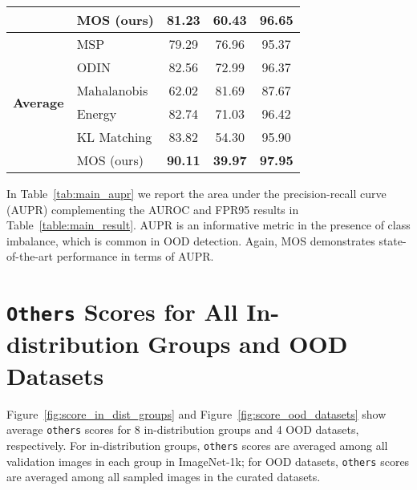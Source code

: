 \documentclass[final]{cvpr}
\begin{document}
\begin{table*}[h]
\begin{tabular}{l|l|ccc}
                                      & MOS (ours)                                            & 81.23                & 60.43                & 96.65                \\ \midrule
\multirow{6}{*}{\textbf{Average}}     & MSP                                                   & 79.29                & 76.96                & 95.37                \\
                                      & ODIN                                                  & 82.56                & 72.99                & 96.37                \\
                                      & Mahalanobis                                           & 62.02                & 81.69                & 87.67                \\
                                      & Energy                                                & 82.74                & 71.03                & 96.42                \\
                                      & KL Matching                                           & 83.82                & 54.30                & 95.90                \\
                                      & MOS (ours)                                            & \textbf{90.11}       & \textbf{39.97}       & \textbf{97.95}       \\ \bottomrule
\end{tabular}
    \caption{\small{Main results with AUPR. Experimental setups are the same as in Table~\ref{table:main_result}.}}
    \label{tab:main_aupr}
\end{table*}

In Table~\ref{tab:main_aupr} we report the area under the precision-recall curve (AUPR) complementing the AUROC and FPR95 results in Table~\ref{table:main_result}. AUPR is an informative metric in the presence of class imbalance, which is common in OOD detection. Again, MOS demonstrates state-of-the-art performance in terms of AUPR.

\section{\texttt{Others} Scores for All In-distribution Groups and OOD Datasets}
\label{app:all_score_dist}


Figure~\ref{fig:score_in_dist_groups} and Figure~\ref{fig:score_ood_datasets} show average \texttt{others} scores for 8 in-distribution groups and 4 OOD datasets, respectively. For in-distribution groups, \texttt{others} scores are averaged among all validation images in each group in ImageNet-1k; for OOD datasets, \texttt{others} scores are averaged among all sampled images in the curated datasets.
\end{document}
